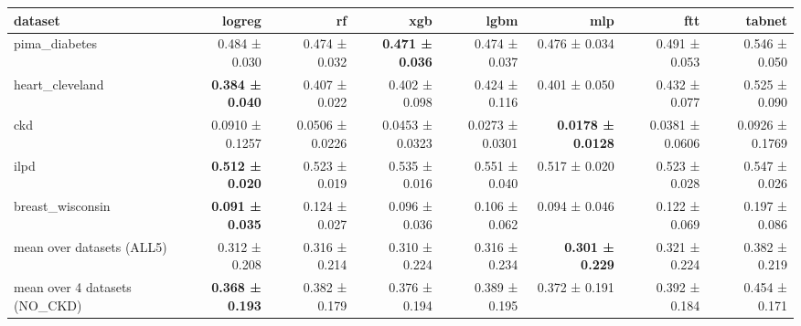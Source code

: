 \begin{tabular}{lrrrrrrr}
\toprule
dataset & logreg & rf & xgb & lgbm & mlp & ftt & tabnet \\
\midrule
pima\_diabetes & 0.484 ± 0.030 & 0.474 ± 0.032 & \textbf{0.471 ± 0.036} & 0.474 ± 0.037 & 0.476 ± 0.034 & 0.491 ± 0.053 & 0.546 ± 0.050 \\
heart\_cleveland & \textbf{0.384 ± 0.040} & 0.407 ± 0.022 & 0.402 ± 0.098 & 0.424 ± 0.116 & 0.401 ± 0.050 & 0.432 ± 0.077 & 0.525 ± 0.090 \\
ckd & 0.0910 ± 0.1257 & 0.0506 ± 0.0226 & 0.0453 ± 0.0323 & 0.0273 ± 0.0301 & \textbf{0.0178 ± 0.0128} & 0.0381 ± 0.0606 & 0.0926 ± 0.1769 \\
ilpd & \textbf{0.512 ± 0.020} & 0.523 ± 0.019 & 0.535 ± 0.016 & 0.551 ± 0.040 & 0.517 ± 0.020 & 0.523 ± 0.028 & 0.547 ± 0.026 \\
breast\_wisconsin & \textbf{0.091 ± 0.035} & 0.124 ± 0.027 & 0.096 ± 0.036 & 0.106 ± 0.062 & 0.094 ± 0.046 & 0.122 ± 0.069 & 0.197 ± 0.086 \\
mean over datasets (ALL5) & 0.312 ± 0.208 & 0.316 ± 0.214 & 0.310 ± 0.224 & 0.316 ± 0.234 & \textbf{0.301 ± 0.229} & 0.321 ± 0.224 & 0.382 ± 0.219 \\
mean over 4 datasets (NO\_CKD) & \textbf{0.368 ± 0.193} & 0.382 ± 0.179 & 0.376 ± 0.194 & 0.389 ± 0.195 & 0.372 ± 0.191 & 0.392 ± 0.184 & 0.454 ± 0.171 \\
\bottomrule
\end{tabular}
